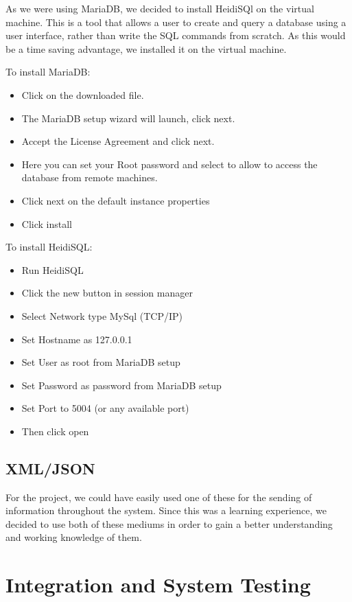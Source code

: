 As we were using MariaDB, we decided to install HeidiSQl on the virtual machine. This is a tool that allows a user to create and query a database using a user interface, rather than write the SQL commands from scratch. As this would be a time saving advantage, we installed it on the virtual machine.
\newline

To install MariaDB:
\begin{itemize}
\item Click on the downloaded file.
\item The MariaDB setup wizard will launch, click next.
\item Accept the License Agreement and click next.
\item Here you can set your Root password and select to allow to access the database from remote machines.
\item Click next on the default instance properties 
\item Click install 
\end{itemize}
\newline

To install HeidiSQL:
\begin{itemize}
\item Run HeidiSQL
\item Click the new button in session manager
\item Select Network type MySql (TCP/IP)
\item Set Hostname as 127.0.0.1
\item Set User as root from MariaDB setup 
\item Set Password as password from MariaDB setup 
\item Set Port to 5004 (or any available port)
\item Then click open
\end{itemize}
\newpage
\subsection{XML/JSON}
For the project, we could have easily used one of these for the sending of information throughout the system. Since this was a learning experience, we decided to use both of these mediums in order to gain a better understanding and working knowledge of them. 
\section{Integration and System Testing}


